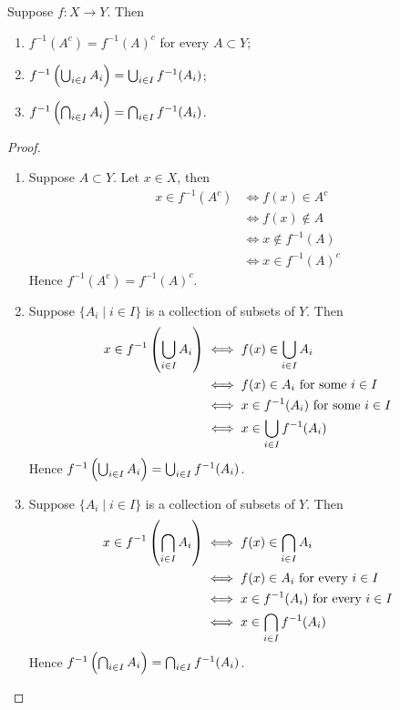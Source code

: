 \begin{lemma}
Suppose $f:X\to Y$. Then
\begin{enumerate}[label=(\roman*)]
\item $f^{-1}(A^c)=f^{-1}(A)^c$ for every $A\subset Y$;
\item $f^{-1}\left(\bigcup_{i\in I}A_i\right)=\bigcup_{i\in I}f^{-1}(A_i)$;
\item $f^{-1}\left(\bigcap_{i\in I}A_i\right)=\bigcap_{i\in I}f^{-1}(A_i)$.
\end{enumerate}
\end{lemma}

\begin{proof} \
\begin{enumerate}[label=(\roman*)]
\item Suppose $A\subset Y$. Let $x\in X$, then
\begin{align*}
x\in f^{-1}(A^c)&\iff f(x)\in A^c\\
&\iff f(x)\notin A\\
&\iff x\notin f^{-1}(A)\\
&\iff x\in f^{-1}(A)^c
\end{align*}
Hence $f^{-1}(A^c)=f^{-1}(A)^c$.

\item Suppose $\{A_i\mid i\in I\}$ is a collection of subsets of $Y$. Then
\begin{align*}
x\in f^{-1}\left(\bigcup_{i\in I}A_i\right)
&\iff f(x)\in\bigcup_{i\in I}A_i\\
&\iff f(x)\in A_i\text{ for some }i\in I\\
&\iff x\in f^{-1}(A_i)\text{ for some }i\in I\\
&\iff x\in\bigcup_{i\in I}f^{-1}(A_i)
\end{align*}
Hence $f^{-1}\left(\bigcup_{i\in I}A_i\right)=\bigcup_{i\in I}f^{-1}(A_i)$.

\item Suppose $\{A_i\mid i\in I\}$ is a collection of subsets of $Y$. Then
\begin{align*}
x\in f^{-1}\left(\bigcap_{i\in I}A_i\right)
&\iff f(x)\in\bigcap_{i\in I}A_i\\
&\iff f(x)\in A_i\text{ for every }i\in I\\
&\iff x\in f^{-1}(A_i)\text{ for every }i\in I\\
&\iff x\in\bigcap_{i\in I}f^{-1}(A_i)
\end{align*}
Hence $f^{-1}\left(\bigcap_{i\in I}A_i\right)=\bigcap_{i\in I}f^{-1}(A_i)$.
\end{enumerate}
\end{proof}


